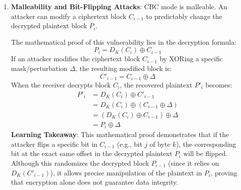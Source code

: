 \documentclass[11pt,a4paper]{article}
\begin{document}
\begin{enumerate}
    \item \textbf{Malleability and Bit-Flipping Attacks}: CBC mode is malleable. An attacker can modify a ciphertext block $C_{i-1}$ to predictably change the decrypted plaintext block $P_i$.
    
    The mathematical proof of this vulnerability lies in the decryption formula:
    \begin{equation}
        P_i = D_K(C_i) \oplus C_{i-1}
    \end{equation}
    If an attacker modifies the ciphertext block $C_{i-1}$ by XORing a specific mask/perturbation $\Delta$, the resulting modified block is:
    \begin{equation}
        C'_{i-1} = C_{i-1} \oplus \Delta
    \end{equation}
    When the receiver decrypts block $C_i$, the recovered plaintext $P'_i$ becomes:
    \begin{align}
        P'_i &= D_K(C_i) \oplus C'_{i-1} \\
             &= D_K(C_i) \oplus (C_{i-1} \oplus \Delta) \\
             &= (D_K(C_i) \oplus C_{i-1}) \oplus \Delta \\
             &= P_i \oplus \Delta
    \end{align}
    \textbf{Learning Takeaway}: This mathematical proof demonstrates that if the attacker flips a specific bit in $C_{i-1}$ (e.g., bit $j$ of byte $k$), the corresponding bit at the exact same offset in the decrypted plaintext $P_i$ will be flipped. Although this randomizes the decrypted block $P_{i-1}$ (since it relies on $D_K(C'_{i-1})$), it allows precise manipulation of the plaintext in $P_i$, proving that encryption alone does not guarantee data integrity.
    

\end{enumerate}
\end{document}
